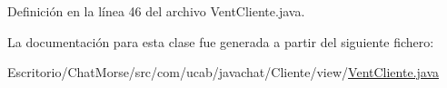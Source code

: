 Definición en la línea 46 del archivo Vent\-Cliente.\-java.



La documentación para esta clase fue generada a partir del siguiente fichero\-:\begin{DoxyCompactItemize}
\item 
Escritorio/\-Chat\-Morse/src/com/ucab/javachat/\-Cliente/view/\hyperlink{_vent_cliente_8java}{Vent\-Cliente.\-java}\end{DoxyCompactItemize}
